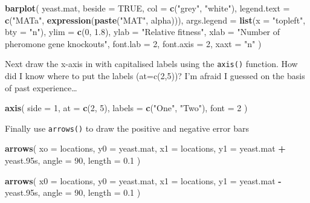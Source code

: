 \documentclass[
]{book}
\newenvironment{Shaded}{\begin{snugshade}}{\end{snugshade}}
\newcommand{\DataTypeTok}[1]{\textcolor[rgb]{0.13,0.29,0.53}{#1}}
\newcommand{\DecValTok}[1]{\textcolor[rgb]{0.00,0.00,0.81}{#1}}
\newcommand{\FloatTok}[1]{\textcolor[rgb]{0.00,0.00,0.81}{#1}}
\newcommand{\KeywordTok}[1]{\textcolor[rgb]{0.13,0.29,0.53}{\textbf{#1}}}
\newcommand{\NormalTok}[1]{#1}
\newcommand{\OperatorTok}[1]{\textcolor[rgb]{0.81,0.36,0.00}{\textbf{#1}}}
\newcommand{\OtherTok}[1]{\textcolor[rgb]{0.56,0.35,0.01}{#1}}
\newcommand{\StringTok}[1]{\textcolor[rgb]{0.31,0.60,0.02}{#1}}
\begin{document}
\begin{Shaded}
\begin{Highlighting}[]
\KeywordTok{barplot}\NormalTok{(}
\NormalTok{  yeast.mat,}
  \DataTypeTok{beside =} \OtherTok{TRUE}\NormalTok{,}
  \DataTypeTok{col =} \KeywordTok{c}\NormalTok{(}\StringTok{"grey"}\NormalTok{, }\StringTok{"white"}\NormalTok{),}
  \DataTypeTok{legend.text =} \KeywordTok{c}\NormalTok{(}\StringTok{"MATa"}\NormalTok{, }\KeywordTok{expression}\NormalTok{(}\KeywordTok{paste}\NormalTok{(}\StringTok{"MAT"}\NormalTok{, alpha))),}
  \DataTypeTok{args.legend =} \KeywordTok{list}\NormalTok{(}\DataTypeTok{x =} \StringTok{"topleft"}\NormalTok{, }\DataTypeTok{bty =} \StringTok{"n"}\NormalTok{),}
  \DataTypeTok{ylim =} \KeywordTok{c}\NormalTok{(}\DecValTok{0}\NormalTok{, }\FloatTok{1.8}\NormalTok{),}
  \DataTypeTok{ylab =} \StringTok{"Relative fitness"}\NormalTok{,}
  \DataTypeTok{xlab =} \StringTok{"Number of pheromone gene knockouts"}\NormalTok{,}
  \DataTypeTok{font.lab =} \DecValTok{2}\NormalTok{,}
  \DataTypeTok{font.axis =} \DecValTok{2}\NormalTok{,}
  \DataTypeTok{xaxt =} \StringTok{"n"}
\NormalTok{)}
\end{Highlighting}
\end{Shaded}

Next draw the x-axis in with capitalised labels using the \texttt{axis()} function. How did I know where to put the labels (at=c(2,5))? I'm afraid I guessed on the basis of past experience\ldots{}

\begin{Shaded}
\begin{Highlighting}[]
\KeywordTok{axis}\NormalTok{(}
  \DataTypeTok{side =} \DecValTok{1}\NormalTok{,}
  \DataTypeTok{at =} \KeywordTok{c}\NormalTok{(}\DecValTok{2}\NormalTok{, }\DecValTok{5}\NormalTok{),}
  \DataTypeTok{labels =} \KeywordTok{c}\NormalTok{(}\StringTok{"One"}\NormalTok{, }\StringTok{"Two"}\NormalTok{),}
  \DataTypeTok{font =} \DecValTok{2}
\NormalTok{)}
\end{Highlighting}
\end{Shaded}

Finally use \texttt{arrows()} to draw the positive and negative error bars

\begin{Shaded}
\begin{Highlighting}[]
\KeywordTok{arrows}\NormalTok{(}
  \DataTypeTok{xo =}\NormalTok{ locations,}
  \DataTypeTok{y0 =}\NormalTok{ yeast.mat,}
  \DataTypeTok{x1 =}\NormalTok{ locations,}
  \DataTypeTok{y1 =}\NormalTok{ yeast.mat }\OperatorTok{+}\StringTok{ }\NormalTok{yeast}\FloatTok{.95}\NormalTok{s,}
  \DataTypeTok{angle =} \DecValTok{90}\NormalTok{,}
  \DataTypeTok{length =} \FloatTok{0.1}
\NormalTok{)}

\KeywordTok{arrows}\NormalTok{(}
  \DataTypeTok{x0 =}\NormalTok{ locations,}
  \DataTypeTok{y0 =}\NormalTok{ yeast.mat,}
  \DataTypeTok{x1 =}\NormalTok{ locations,}
  \DataTypeTok{y1 =}\NormalTok{ yeast.mat }\OperatorTok{-}\StringTok{ }\NormalTok{yeast}\FloatTok{.95}\NormalTok{s,}
  \DataTypeTok{angle =} \DecValTok{90}\NormalTok{,}
  \DataTypeTok{length =} \FloatTok{0.1}
\NormalTok{)}
\end{Highlighting}
\end{Shaded}
\end{document}
